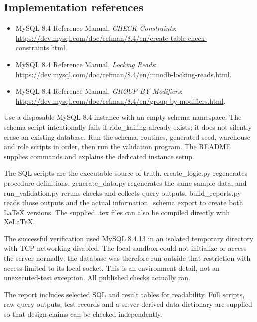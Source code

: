 \documentclass[11pt,a4paper]{article}
\begin{document}
\subsection*{Implementation references}
\begin{itemize}\small
\item MySQL 8.4 Reference Manual, \emph{CHECK Constraints}: \url{https://dev.mysql.com/doc/refman/8.4/en/create-table-check-constraints.html}.
\item MySQL 8.4 Reference Manual, \emph{Locking Reads}: \url{https://dev.mysql.com/doc/refman/8.4/en/innodb-locking-reads.html}.
\item MySQL 8.4 Reference Manual, \emph{GROUP BY Modifiers}: \url{https://dev.mysql.com/doc/refman/8.4/en/group-by-modifiers.html}.
\end{itemize}
Use a disposable MySQL 8.4 instance with an empty schema namespace. The schema script intentionally fails if ride\_\allowbreak{}hailing already exists; it does not silently erase an existing database. Run the schema, routines, generated seed, warehouse and role scripts in order, then run the validation program. The README supplies commands and explains the dedicated instance setup.

The SQL scripts are the executable source of truth. create\_\allowbreak{}logic.py regenerates procedure definitions, generate\_\allowbreak{}data.py regenerates the same sample data, and run\_\allowbreak{}validation.py reruns checks and collects query outputs. build\_\allowbreak{}reports.py reads those outputs and the actual information\_\allowbreak{}schema export to create both LaTeX versions. The supplied .tex files can also be compiled directly with XeLaTeX.

The successful verification used MySQL 8.4.13 in an isolated temporary directory with TCP networking disabled. The local sandbox could not initialize or access the server normally; the database was therefore run outside that restriction with access limited to its local socket. This is an environment detail, not an unexecuted-test exception. All published checks actually ran.

The report includes selected SQL and result tables for readability. Full scripts, raw query outputs, test records and a server-derived data dictionary are supplied so that design claims can be checked independently.
\end{document}
